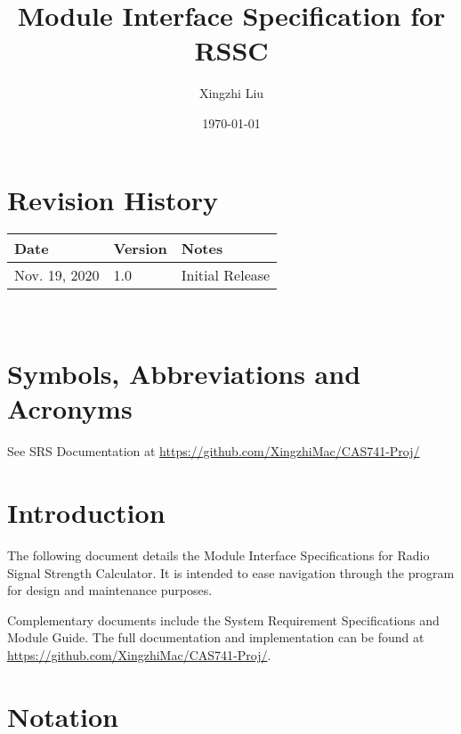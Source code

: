 \documentclass[12pt, titlepage]{article}
\begin{document}
\title{Module Interface Specification for RSSC}

\author{Xingzhi Liu}

\date{\today}

\maketitle


\section{Revision History}

\begin{tabularx}{\textwidth}{p{3cm}p{2cm}X}
\toprule {\bf Date} & {\bf Version} & {\bf Notes}\\
\midrule
Nov. 19, 2020 & 1.0 & Initial Release\\
\bottomrule
\end{tabularx}

~\newpage

\section{Symbols, Abbreviations and Acronyms}

See SRS Documentation at \url{https://github.com/XingzhiMac/CAS741-Proj/}

\newpage

\tableofcontents

\newpage


\section{Introduction}

The following document details the Module Interface Specifications for
Radio Signal Strength Calculator. It is intended to ease navigation through 
the program for design and maintenance purposes.

Complementary documents include the System Requirement Specifications
and Module Guide.  The full documentation and implementation can be
found at \url{https://github.com/XingzhiMac/CAS741-Proj/}. 

\section{Notation}
\end{document}
